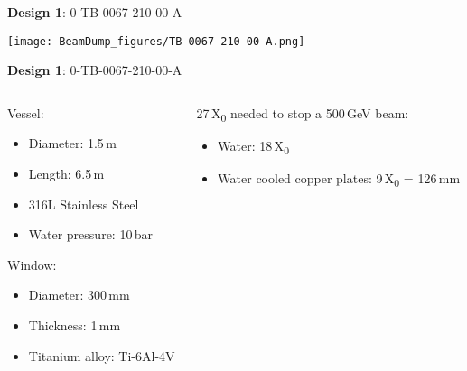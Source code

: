 \documentclass[xcolor={dvipsnames}]{beamer}
\begin{document}
\begin{frame}{\textbf{Design 1}: 0-TB-0067-210-00-A}
\begin{center}
  \texttt{[image: BeamDump\_figures/TB-0067-210-00-A.png]}
\end{center}
\end{frame}
{
\begin{frame}{\textbf{Design 1}: 0-TB-0067-210-00-A}
\begin{columns}
 \begin{column}{0.5\textwidth}
  Vessel:
  \begin{itemize}
   \item Diameter: 1.5\,m
   \item Length: 6.5\,m
   \item 316L Stainless Steel
   \item Water pressure: 10\,bar
  \end{itemize}
  Window:
  \begin{itemize}
   \item Diameter: 300\,mm
   \item Thickness: 1\,mm
   \item Titanium alloy: Ti-6Al-4V 
  \end{itemize}
 \end{column}
 \begin{column}{0.5\textwidth}
  27\,X\textsubscript{0} needed to stop a 500\,GeV beam:
  \begin{itemize}
   \item Water: 18\,X\textsubscript{0}
   \item Water cooled copper plates: 9\,X\textsubscript{0} = 126\,mm
  \end{itemize}  
 \end{column}
\end{columns}

\end{frame}
}
\end{document}
